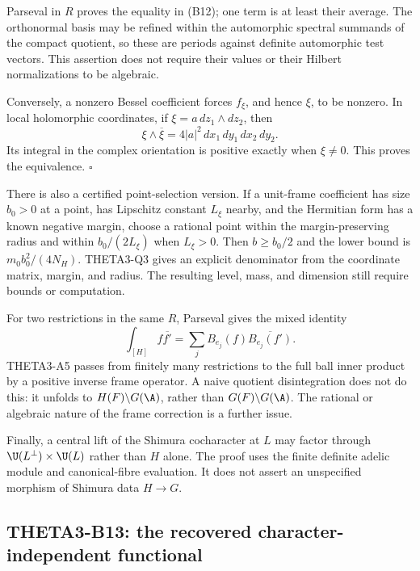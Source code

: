Parseval in $R$ proves the equality in (B12); one term is at least their average. The orthonormal basis may be refined within the automorphic spectral summands of the compact quotient, so these are periods against definite automorphic test vectors. This assertion does not require their values or their Hilbert normalizations to be algebraic.

Conversely, a nonzero Bessel coefficient forces $f_\xi$, and hence $\xi$, to be nonzero. In local holomorphic coordinates, if $\xi=a\,dz_1\wedge dz_2$, then
\[
 \xi\wedge\overline\xi
   =4|a|^2\,dx_1\,dy_1\,dx_2\,dy_2.
\]
Its integral in the complex orientation is positive exactly when $\xi\ne0$. This proves the equivalence. \hfill$\square$

There is also a certified point-selection version. If a unit-frame coefficient has size $b_0>0$ at a point, has Lipschitz constant $L_\xi$ nearby, and the Hermitian form has a known negative margin, choose a rational point within the margin-preserving radius and within $b_0/(2L_\xi)$ when $L_\xi>0$. Then $b\geq b_0/2$ and the lower bound is $m_0b_0^2/(4N_H)$. THETA3-Q3 gives an explicit denominator from the coordinate matrix, margin, and radius. The resulting level, mass, and dimension still require bounds or computation.

For two restrictions in the same $R$, Parseval gives the mixed identity
\[
 \int_{[H]}f\overline{f'}=
 \sum_j B_{e_j}(f)\overline{B_{e_j}(f')}.
\]
THETA3-A5 passes from finitely many restrictions to the full ball inner product by a positive inverse frame operator. A naive quotient disintegration does not do this: it unfolds to $H(F)\backslash G(\A)$, rather than $G(F)\backslash G(\A)$. The rational or algebraic nature of the frame correction is a further issue.

Finally, a central lift of the Shimura cocharacter at $L$ may factor through $\U(L^\perp)\times\U(L)$ rather than $H$ alone. The proof uses the finite definite adelic module and canonical-fibre evaluation. It does not assert an unspecified morphism of Shimura data $H\to G$.

\subsection{THETA3-B13: the recovered character-independent functional}\label{B13}

